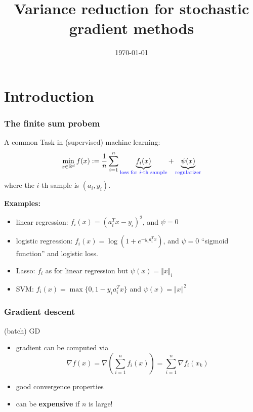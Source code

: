 \documentclass{beamer}
\title{Variance reduction for stochastic gradient methods}
\date{\today}
\begin{document}
\maketitle
\frame{\tableofcontents}


\section{Introduction}%

\begin{frame}
  \frametitle{The finite sum probem}
  A common Task in (supervised) machine learning:
  \begin{equation}
    \min_{x\in \mathbb{R}^d} f(x) := \frac{1}{n} \sum_{i=1}^{n} \underbrace{f_i(x)}_{\textcolor{blue}{\text{loss for $i$-th sample}}} + \underbrace{\psi(x)}_{\textcolor{blue}{\text{regularizer}}}
  \end{equation}
  where the $i$-th sample is $(a_i, y_i)$.

  \textbf{Examples:}
  \begin{itemize}
    \item linear regression: $f_i(x) = {(a_i^T x -y_i)}^2$, and $\psi=0$
    \item logistic regression: $f_i(x) = \log(1+e^{-y_i a_i^T x})$, and $\psi=0$
          ``sigmoid function'' and logistic loss.
    \item Lasso: $f_i$ as for linear regression but $\psi(x) = \Vert x \Vert_i$
    \item SVM: $f_i(x) = \max \{0 , 1 - y_i a_i^T x\}$ and $\psi(x)= \Vert x \Vert^2$
  \end{itemize}
\end{frame}

\begin{frame}
  \frametitle{Gradient descent}
  \begin{algorithm}[H]
    \caption{(batch) GD}
    \begin{algorithmic}[1]
      \EndFor{}
    \end{algorithmic}
  \end{algorithm}

  \begin{itemize}
    \item gradient can be computed via
          \begin{equation}
            \nabla f(x) = \nabla \left(\sum_{i=1}^{n}f_i(x)\right) = \sum_{i=1}^{n} \nabla f_i(x_k)
          \end{equation}
    \item good convergence properties
    \item can be \textbf{expensive} if $n$ is large!
  \end{itemize}
\end{frame}
\end{document}
